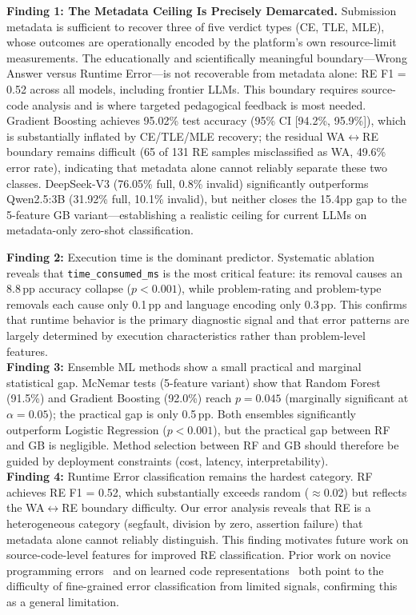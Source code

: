 \documentclass[acmsmall]{acmart}
\begin{document}
\textbf{Finding 1: The Metadata Ceiling Is Precisely Demarcated.} Submission
metadata is sufficient to recover three of five verdict types (CE, TLE, MLE),
whose outcomes are operationally encoded by the platform's own resource-limit
measurements. The educationally and scientifically meaningful boundary---Wrong
Answer versus Runtime Error---is not recoverable from metadata alone: RE F1
= 0.52 across all models, including frontier LLMs. This boundary requires
source-code analysis and is where targeted pedagogical feedback is most needed.
Gradient Boosting achieves 95.02\% test accuracy (95\% CI [94.2\%, 95.9\%]),
which is substantially inflated by CE/TLE/MLE recovery; the residual
WA$\leftrightarrow$RE boundary remains difficult (65 of 131 RE samples misclassified
as WA, 49.6\% error rate), indicating that metadata alone cannot reliably
separate these two classes. DeepSeek-V3 (76.05\% full,
0.8\% invalid) significantly outperforms Qwen2.5:3B (31.92\% full, 10.1\%
invalid), but neither closes the 15.4pp gap to the 5-feature GB variant---establishing a realistic
ceiling for current LLMs on metadata-only zero-shot classification.

\textbf{Finding 2:} Execution time is the dominant predictor. Systematic
ablation reveals that \texttt{time\_consumed\_ms} is the most critical
feature: its removal causes an 8.8\,pp accuracy collapse ($p < 0.001$), while
problem-rating and problem-type removals each cause only 0.1\,pp and language
encoding only 0.3\,pp. This confirms that runtime behavior is the primary
diagnostic signal and that error patterns are largely determined by execution
characteristics rather than problem-level features.\\

\textbf{Finding 3:} Ensemble ML methods show a small practical and
marginal statistical gap. McNemar tests (5-feature variant) show that Random
Forest (91.5\%) and Gradient Boosting (92.0\%) reach $p = 0.045$ (marginally
significant at $\alpha = 0.05$); the practical gap is only 0.5\,pp. Both ensembles
significantly outperform Logistic Regression ($p < 0.001$), but the practical
gap between RF and GB is negligible. Method selection between RF and GB should
therefore be guided by deployment constraints (cost, latency, interpretability).\\

\textbf{Finding 4:} Runtime Error classification remains the hardest category.
RF achieves RE F1 = 0.52, which substantially exceeds random ($\approx$0.02) but reflects
the WA$\leftrightarrow$RE boundary difficulty. Our error analysis reveals
that RE is a heterogeneous category (segfault, division by zero, assertion
failure) that metadata alone cannot reliably distinguish. This finding
motivates future work on source-code-level features for improved RE
classification. Prior work on novice programming errors~\cite{altadmri2015most} and on
learned code representations~\cite{allamanis2018learning} both point to the
difficulty of fine-grained error classification from limited signals,
confirming this as a general limitation.\\
\end{document}
